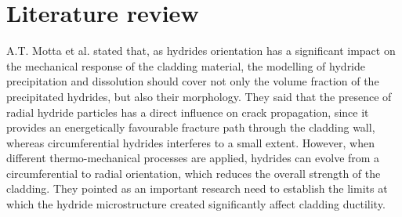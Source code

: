 \section{Literature review}

A.T. Motta et al. \cite{MOTTA2019440} stated that, as hydrides orientation has a significant impact on the mechanical response of the cladding material, the modelling of hydride precipitation and dissolution should cover not only the volume fraction of the precipitated hydrides, but also their morphology. They said that the presence of radial hydride particles has a direct influence on crack propagation, since it provides an energetically favourable fracture path through the cladding wall, whereas circumferential hydrides interferes to a small extent. However, when different thermo-mechanical processes are applied, hydrides can evolve from a circumferential to radial orientation, which reduces the overall strength of the cladding. They pointed as an important research need to establish the limits at which the hydride microstructure created significantly affect cladding ductility.

\cite{COLAS2013586}
\cite{SHARMA2018546}
\cite{SUNIL2020152457}